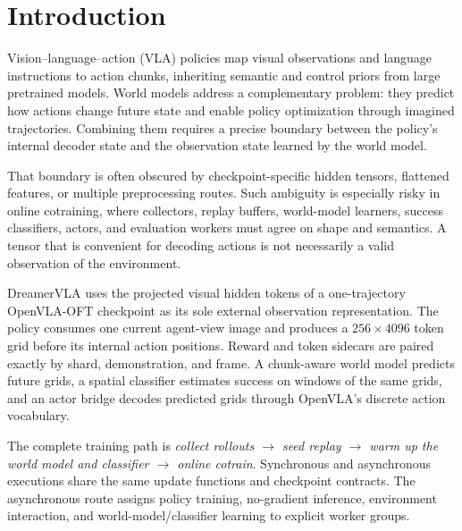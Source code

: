 \section{Introduction}

Vision--language--action (VLA) policies map visual observations and language
instructions to action chunks, inheriting semantic and control priors from large
pretrained models.  World models address a complementary problem: they predict
how actions change future state and enable policy optimization through imagined
trajectories.  Combining them requires a precise boundary between the policy's
internal decoder state and the observation state learned by the world model.

That boundary is often obscured by checkpoint-specific hidden tensors, flattened
features, or multiple preprocessing routes.  Such ambiguity is especially risky
in online cotraining, where collectors, replay buffers, world-model learners,
success classifiers, actors, and evaluation workers must agree on shape and
semantics.  A tensor that is convenient for decoding actions is not necessarily
a valid observation of the environment.

DreamerVLA uses the projected visual hidden tokens of a one-trajectory
OpenVLA-OFT checkpoint as its sole external observation representation.  The
policy consumes one current agent-view image and produces a $256\times4096$
token grid before its internal action positions.  Reward and token sidecars are
paired exactly by shard, demonstration, and frame.  A chunk-aware world model
predicts future grids, a spatial classifier estimates success on windows of the
same grids, and an actor bridge decodes predicted grids through OpenVLA's
discrete action vocabulary.

The complete training path is
\emph{collect rollouts $\rightarrow$ seed replay $\rightarrow$ warm up the world
model and classifier $\rightarrow$ online cotrain}.  Synchronous and asynchronous
executions share the same update functions and checkpoint contracts.  The
asynchronous route assigns policy training, no-gradient inference, environment
interaction, and world-model/classifier learning to explicit worker groups.

